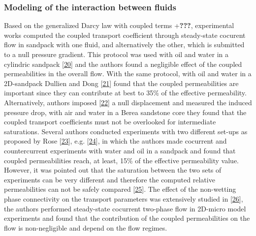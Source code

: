 \documentclass[]{article}
\begin{document}
\hypertarget{modeling-of-the-interaction-between-fluids}{%
\subsubsection{Modeling of the interaction between
fluids}\label{modeling-of-the-interaction-between-fluids}}

Based on the generalized Darcy law with coupled terms +\textbf{???},
experimental works computed the coupled transport coefficient through
steady-state cocurent flow in sandpack with one fluid, and alternatively
the other, which is submitted to a null pressure gradient. This protocol
was used with oil and water in a cylindric sandpack
{[}\protect\hyperlink{ref-zarcone1994determination}{20}{]} and the
authors found a negligible effect of the coupled permeabilities in the
overall flow. With the same protocol, with oil and water in a
2D-sandpack Dullien and Dong
{[}\protect\hyperlink{ref-Dullien1996}{21}{]} found that the coupled
permeabilities are important since they can contribute at best to 35\%
of the effective permeability. Alternatively, authors imposed
{[}\protect\hyperlink{ref-ramakrishnan2015measurement}{22}{]} a null
displacement and measured the induced pressure drop, with air and water
in a Berea sandstone core they found that the coupled transport
coefficients must not be overlooked for intermediate saturations.
Several authors conducted experiments with two different set-ups as
proposed by Rose {[}\protect\hyperlink{ref-Rose1988}{23}{]}, e.g.
{[}\protect\hyperlink{ref-bentsen1993use}{24}{]}, in which the authors
made cocurrent and countercurrent experiments with water and oil in a
sandpack and found that coupled permeabilities reach, at least, 15\% of
the effective permeability value. However, it was pointed out that the
saturation between the two sets of experiments can be very different and
therefore the computed relative permeabilities can not be safely
compared {[}\protect\hyperlink{ref-langaas2001numerical}{25}{]}. The
effect of the non-wetting phase connectivity on the transport parameters
was extensively studied in {[}\protect\hyperlink{ref-Avraam1995}{26}{]},
the authors performed steady-state cocurrent two-phase flow in 2D-micro
model experiments and found that the contribution of the coupled
permeabilities on the flow is non-negligible and depend on the flow
regimes.
\end{document}

